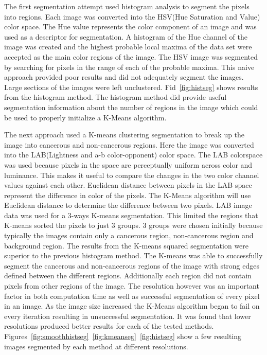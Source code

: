 \documentclass[letterpaper,10pt,oneside]{article}
\begin{document}
The first segmentation attempt used histogram analysis to segment the pixels into regions. Each image was converted into the HSV(Hue Saturation and Value) color space. The Hue value represents the color component of an image and was used as a descriptor for segmentation. A histogram of the Hue channel of the image was created and the highest probable local maxima of the data set were accepted as the main color regions of the image. The HSV image was segmented by searching for pixels in the range of each of the probable maxima. This naive approach provided poor results and did not adequately segment the images. Large sections of the images were left unclustered. Fid~\ref{fig:histseg} shows results from the histogram method. The histogram method did provide useful segmentation information about the number of regions in the image which could be used to properly initialize a K-Means algorithm.

The next approach used a K-means clustering segmentation to break up the image into cancerous and non-cancerous regions. Here the image was converted into the LAB(Lightness and a-b color-opponent) color space. The LAB colorspace was used because pixels in the space are perceptually uniform across color and luminance. This makes it useful to compare the changes in the two color channel values against each other. Euclidean distance between pixels in the LAB space represent the difference in color of the pixels. The K-Means algorithm will use Euclidean distance to determine the difference between two pixels. LAB image data was used for a 3-ways K-means segmentation. This limited the regions that K-means sorted the pixels to just 3 groups. 3 groups were chosen initially because typically the images contain only a cancerous region, non-cancerous region and background region. The results from the K-means squared segmentation were superior to the previous histogram method. The K-means was able to successfully segment the cancerous and non-cancerous regions of the image with strong edges defined between the different regions. Additionally each region did not contain pixels from other regions of the image. The resolution however was an important factor in both computation time as well as successful segmentation of every pixel in an image. As the image size increased the K-Means algorithm began to fail on every iteration resulting in unsuccessful segmentation. It was found that lower resolutions produced better results for each of the tested methods. Figures~\ref{fig:smoothhistseg}~\ref{fig:kmeanseg}~\ref{fig:histseg} show a few resulting images segmented by each method at different resolutions.
\end{document}
